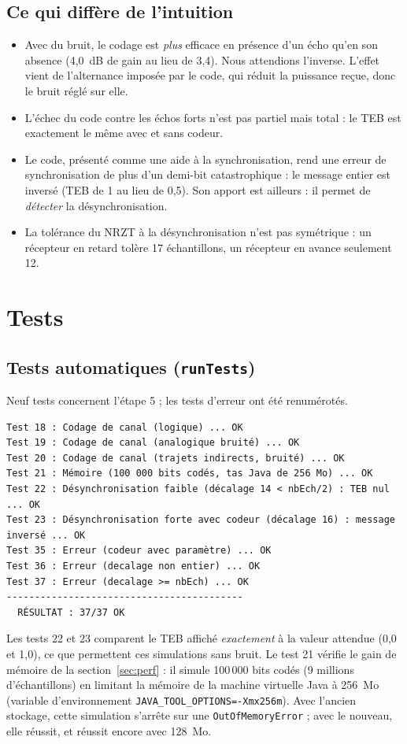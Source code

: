 \documentclass[11pt,a4paper]{article}
\begin{document}
\subsection{Ce qui diffère de l'intuition}
\begin{itemize}
  \item Avec du bruit, le codage est \emph{plus} efficace en présence d'un écho qu'en son absence (4,0~dB de gain au lieu de 3,4). Nous attendions l'inverse. L'effet vient de l'alternance imposée par le code, qui réduit la puissance reçue, donc le bruit réglé sur elle.
  \item L'échec du code contre les échos forts n'est pas partiel mais total : le TEB est exactement le même avec et sans codeur.
  \item Le code, présenté comme une aide à la synchronisation, rend une erreur de synchronisation de plus d'un demi-bit catastrophique : le message entier est inversé (TEB de 1 au lieu de 0,5). Son apport est ailleurs : il permet de \emph{détecter} la désynchronisation.
  \item La tolérance du NRZT à la désynchronisation n'est pas symétrique : un récepteur en retard tolère 17 échantillons, un récepteur en avance seulement 12.
\end{itemize}

\section{Tests}
\subsection{Tests automatiques (\texttt{runTests})}
Neuf tests concernent l'étape 5 ; les tests d'erreur ont été renumérotés.
\begin{lstlisting}[language={}]
Test 18 : Codage de canal (logique) ... OK
Test 19 : Codage de canal (analogique bruité) ... OK
Test 20 : Codage de canal (trajets indirects, bruité) ... OK
Test 21 : Mémoire (100 000 bits codés, tas Java de 256 Mo) ... OK
Test 22 : Désynchronisation faible (décalage 14 < nbEch/2) : TEB nul ... OK
Test 23 : Désynchronisation forte avec codeur (décalage 16) : message inversé ... OK
Test 35 : Erreur (codeur avec paramètre) ... OK
Test 36 : Erreur (decalage non entier) ... OK
Test 37 : Erreur (decalage >= nbEch) ... OK
------------------------------------------
  RÉSULTAT : 37/37 OK
\end{lstlisting}
Les tests 22 et 23 comparent le TEB affiché \emph{exactement} à la valeur attendue (0,0 et 1,0), ce que permettent ces simulations sans bruit.
Le test 21 vérifie le gain de mémoire de la section~\ref{sec:perf} : il simule 100\,000 bits codés (9 millions d'échantillons) en limitant la mémoire de la machine virtuelle Java à 256~Mo (variable d'environnement \texttt{JAVA\_TOOL\_OPTIONS=-Xmx256m}). Avec l'ancien stockage, cette simulation s'arrête sur une \texttt{OutOfMemoryError} ; avec le nouveau, elle réussit, et réussit encore avec 128~Mo.
\end{document}
